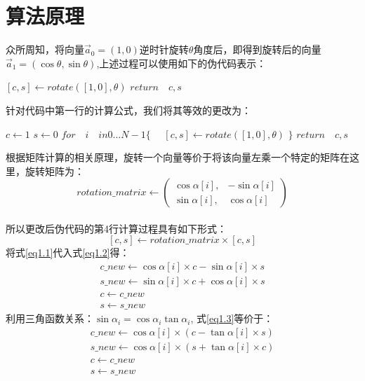 \documentclass[a4paper,12pt]{report}
\begin{document}
\section{算法原理}
众所周知，将向量$\vec{a}_0 = (1,0)$逆时针旋转$\theta$角度后，即得到旋转后的向量$\vec{a}_1 = (\cos\theta, \sin\theta)$,上述过程可以使用如下的伪代码表示：
{
\begin{codebox}
\li $[c, s] \leftarrow rotate([1, 0], \theta)$
\li $return \quad c, s$
\end{codebox}
}
针对代码中第一行的计算公式，我们将其等效的更改为：
\begin{codebox}
\li $c \leftarrow 1$
\li $s \leftarrow 0$
\li $for \quad i \quad in 0 \dots N-1\{$
\li $\quad [c, s] \leftarrow rotate([1, 0], \theta)$
\li $\}$
\li $return \quad c, s$
\end{codebox}
根据矩阵计算的相关原理，旋转一个向量等价于将该向量左乘一个特定的矩阵在这里，旋转矩阵为：
\begin{equation}\label{eq1.1}
rotation\_matrix \leftarrow \left( \begin{array}{cc}
\cos\alpha[i], & -\sin\alpha[i] \\
\sin\alpha[i], & \cos\alpha[i]
\end{array}
\right)
\end{equation}\\
所以更改后伪代码的第4行计算过程具有如下形式：
\begin{equation}\label{eq1.2}
[c,s] \leftarrow rotation\_matrix \times [c,s]
\end{equation}
将式\ref{eq1.1}代入式\ref{eq1.2}得：
\begin{equation}\label{eq1.3}
\begin{gathered}
c\_new \leftarrow \cos\alpha[i] \times c - \sin\alpha[i] \times s\\
s\_new \leftarrow \sin\alpha[i] \times c + \cos\alpha[i] \times s\\
c \leftarrow c\_new\\
s \leftarrow s\_new
\end{gathered}
\end{equation}
利用三角函数关系：$\sin \alpha_i = \cos\alpha_i \tan\alpha_i$, 式\ref{eq1.3}等价于：
\begin{equation}\label{eq1.4}
\begin{gathered}
c\_new \leftarrow \cos\alpha[i] \times (c - \tan\alpha[i] \times s)\\
s\_new \leftarrow \cos\alpha[i] \times (s + \tan\alpha[i] \times c)\\
c \leftarrow c\_new\\
s \leftarrow s\_new
\end{gathered}
\end{equation}
\end{document}
